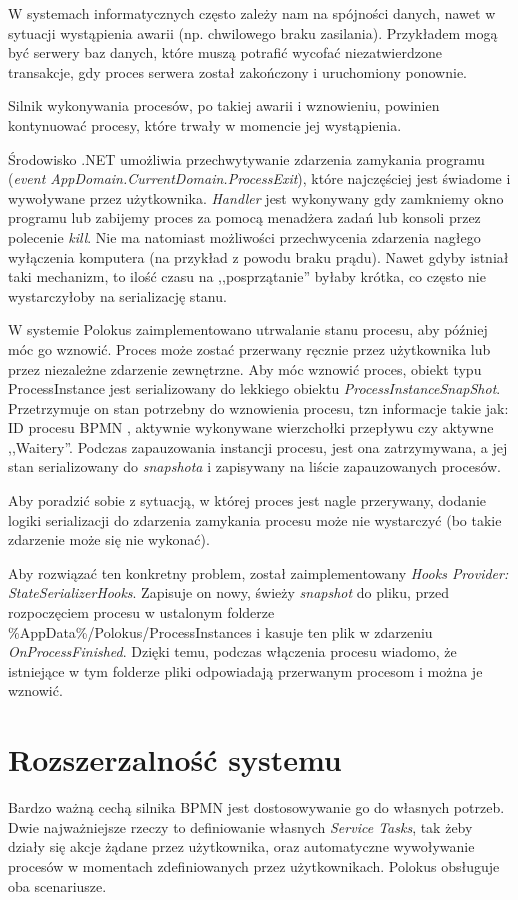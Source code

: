 \documentclass[declaration,shortabstract,mgr]{iithesis}
\newcommand{\bpmn}{BPMN }
\begin{document}
W systemach informatycznych często zależy nam na spójności danych, nawet w sytuacji wystąpienia awarii (np. chwilowego braku zasilania). Przykładem mogą być serwery baz danych, które muszą potrafić wycofać niezatwierdzone transakcje, gdy proces serwera został zakończony i uruchomiony ponownie. 

Silnik wykonywania procesów, po takiej awarii i wznowieniu, powinien kontynuować procesy, które trwały w momencie jej wystąpienia.

Środowisko .NET umożliwia przechwytywanie zdarzenia zamykania programu (\textit{event AppDomain.CurrentDomain.ProcessExit}), które najczęściej jest świadome i wywoływane przez użytkownika. \textit{Handler} jest wykonywany gdy zamkniemy okno programu lub zabijemy proces za pomocą menadżera zadań lub konsoli przez polecenie \textit{kill}. Nie ma natomiast możliwości przechwycenia zdarzenia nagłego wyłączenia komputera (na przykład z powodu braku prądu). Nawet gdyby istniał taki mechanizm, to ilość czasu na ,,posprzątanie'' byłaby krótka, co często nie wystarczyłoby na serializację stanu. 

W systemie Polokus zaimplementowano utrwalanie stanu procesu, aby później móc go wznowić. Proces może zostać przerwany ręcznie przez użytkownika lub przez niezależne zdarzenie zewnętrzne. Aby móc wznowić proces, obiekt typu ProcessInstance jest serializowany do lekkiego obiektu \textit{ProcessInstanceSnapShot}. Przetrzymuje on stan potrzebny do wznowienia procesu, tzn informacje takie jak: ID procesu \bpmn, aktywnie wykonywane wierzchołki przepływu czy aktywne ,,Waitery''. Podczas zapauzowania instancji procesu, jest ona zatrzymywana, a jej stan serializowany do \textit{snapshota} i zapisywany na liście zapauzowanych procesów. 

Aby poradzić sobie z sytuacją, w której proces jest nagle przerywany, dodanie logiki serializacji do zdarzenia zamykania procesu może nie wystarczyć (bo takie zdarzenie może się nie wykonać). 

Aby rozwiązać ten konkretny problem, został zaimplementowany \textit{Hooks Provider: StateSerializerHooks}. Zapisuje on nowy, świeży \textit{snapshot} do pliku, przed rozpoczęciem procesu w ustalonym folderze \%AppData\%/Polokus/ProcessInstances i kasuje ten plik w zdarzeniu \textit{OnProcessFinished}. Dzięki temu, podczas włączenia procesu wiadomo, że istniejące w tym folderze pliki odpowiadają przerwanym procesom i można je wznowić.

\section{Rozszerzalność systemu}
Bardzo ważną cechą silnika \bpmn jest dostosowywanie go do własnych potrzeb. Dwie najważniejsze rzeczy to definiowanie własnych \textit{Service Tasks}, tak żeby działy się akcje żądane przez użytkownika, oraz automatyczne wywoływanie procesów w momentach zdefiniowanych przez użytkownikach. Polokus obsługuje oba scenariusze.
\end{document}
